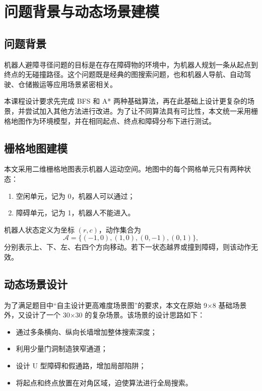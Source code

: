 \chapter{问题背景与动态场景建模}\label{chap:background}

\section{问题背景}

机器人避障寻径问题的目标是在存在障碍物的环境中，为机器人规划一条从起点到终点的无碰撞路径。这个问题既是经典的图搜索问题，也和机器人导航、自动驾驶、仓储搬运等应用场景紧密相关。

本课程设计要求先完成 BFS 和 A* 两种基础算法，再在此基础上设计更复杂的场景，并尝试加入其他方法进行改进。为了让不同算法具有可比性，本文统一采用栅格地图作为环境模型，并在相同起点、终点和障碍分布下进行测试。

\section{栅格地图建模}

本文采用二维栅格地图表示机器人运动空间。地图中的每个网格单元只有两种状态：
\begin{enumerate}
  \item 空闲单元，记为 0，机器人可以通过；
  \item 障碍单元，记为 1，机器人不能进入。
\end{enumerate}

机器人状态定义为坐标 $(r,c)$，动作集合为
\begin{equation}
  \mathcal{A}=\{(-1,0),(1,0),(0,-1),(0,1)\},
\end{equation}
分别表示上、下、左、右四个方向移动。若下一状态越界或撞到障碍，则该动作无效。

\section{动态场景设计}

为了满足题目中“自主设计更高难度场景图”的要求，本文在原始 9$\times$8 基础场景外，又设计了一个 30$\times$30 的复杂场景。该场景的设计思路如下：

\begin{itemize}
  \item 通过多条横向、纵向长墙增加整体搜索深度；
  \item 利用少量门洞制造狭窄通道；
  \item 设计 U 型障碍和假通路，增加局部陷阱；
  \item 将起点和终点放置在对角区域，迫使算法进行全局搜索。
\end{itemize}

